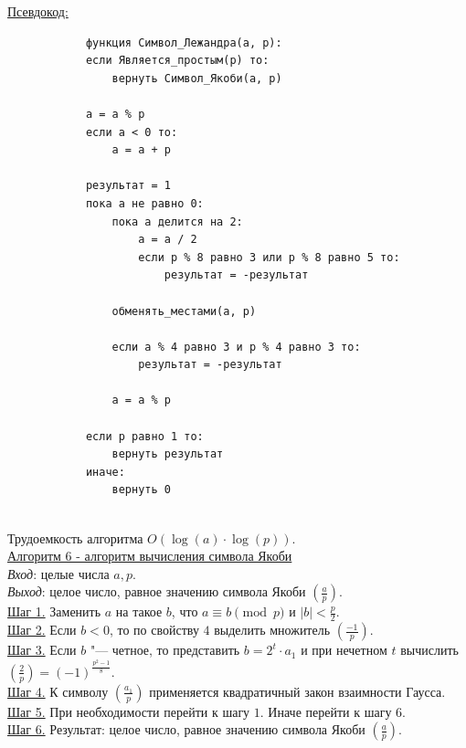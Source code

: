 \documentclass[bachelor, och, labwork]{shiza}
\begin{document}
            \underline{Псевдокод:}
            \begin{verbatim}
            функция Символ_Лежандра(a, p):
            если Является_простым(p) то:
                вернуть Символ_Якоби(a, p)
        
            a = a % p
            если a < 0 то:
                a = a + p
        
            результат = 1
            пока a не равно 0:
                пока a делится на 2:
                    a = a / 2
                    если p % 8 равно 3 или p % 8 равно 5 то:
                        результат = -результат
        
                обменять_местами(a, p)
        
                если a % 4 равно 3 и p % 4 равно 3 то:
                    результат = -результат
        
                a = a % p
        
            если p равно 1 то:
                вернуть результат
            иначе:
                вернуть 0
        
            \end{verbatim}

            Трудоемкость алгоритма $O(\log(a) \cdot \log(p))$.\\

        \underline{Алгоритм 6 - алгоритм вычисления символа Якоби}\\
            \textit{Вход}: целые числа $a, p$.\\
            \textit{Выход}: целое число, равное значению символа Якоби
            $\left(\frac{a}{p}\right)$.\\
            \underline{Шаг 1.} Заменить $a$ на такое $b$, что $a \equiv b \pmod
            p$ и $|b| < \frac{p}{2}$.\\
            \underline{Шаг 2.} Если $b < 0$, то по свойству $4$ выделить
            множитель $\left(\frac{-1}{p}\right)$.\\
            \underline{Шаг 3.} Если $b$ "--- четное, то представить $b = 2^t
            \cdot a_1$ и при нечетном $t$ вычислить $\left(\frac{2}{p}\right) =
            (-1)^{\frac{p^2 - 1}{8}}$.\\
            \underline{Шаг 4.} К символу $\left(\frac{a_1}{p}\right)$
            применяется квадратичный закон взаимности Гаусса.\\
            \underline{Шаг 5.} При необходимости перейти к шагу $1$. Иначе
            перейти к шагу $6$.\\
            \underline{Шаг 6.} Результат: целое число, равное значению символа
            Якоби $\left(\frac{a}{p}\right)$.\\
\end{document}
